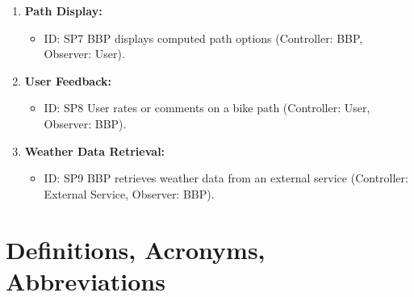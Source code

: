 \begin{enumerate}
    \item \textbf{Path Display:}
    \begin{itemize}
        \item ID: SP7 BBP displays computed path options (Controller: BBP, Observer: User).
    \end{itemize}

    \item \textbf{User Feedback:}
    \begin{itemize}
        \item ID: SP8 User rates or comments on a bike path (Controller: User, Observer: BBP).
    \end{itemize}

    \item \textbf{Weather Data Retrieval:}
    \begin{itemize}
        \item ID: SP9 BBP retrieves weather data from an external service (Controller: External Service, Observer: BBP).
    \end{itemize}
\end{enumerate}

\section{Definitions, Acronyms, Abbreviations}
\label{sec:definition_acronyms_abbreviations}%


